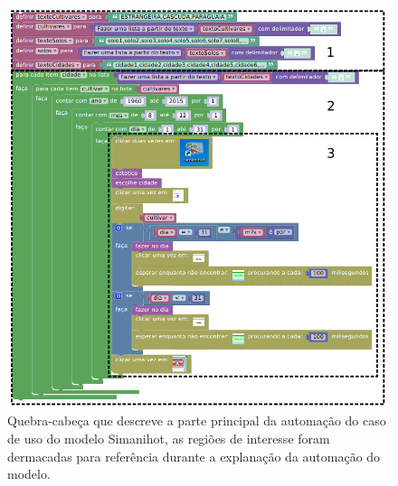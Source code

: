 \documentclass[tg]{mdtufsm}
\begin{document}
                    \begin{figure}[!htb]
                        {\centering
                        \includegraphics[width=1.0\textwidth]{imagens/coreSimani.png}
                        \caption{Quebra-cabeça que descreve a parte principal da automação do caso de uso do modelo Simanihot, as regiões de interesse foram dermacadas para referência durante a explanação da automação do modelo.}
                        \label{fig:coreSimani}}
                    \end{figure}
\end{document}
